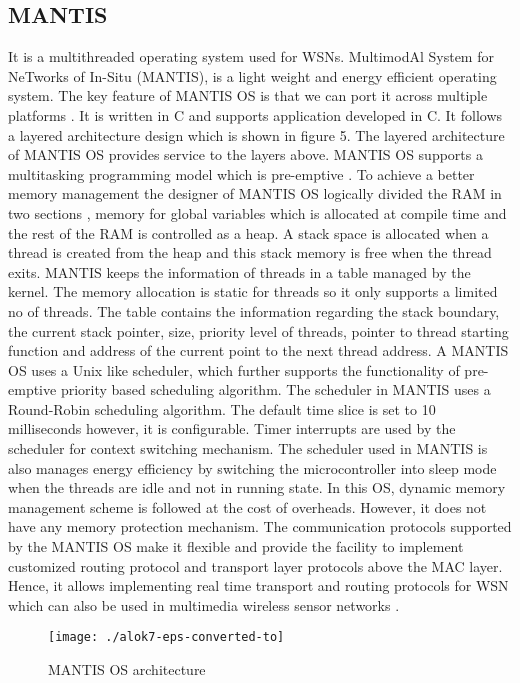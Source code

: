 \documentclass[12pt,journal,communications surveys and tutorials]{IEEEtran}
\begin{document}
\subsection{MANTIS}
It is a multithreaded operating system used for WSNs. MultimodAl System for NeTworks of In-Situ (MANTIS), is a light weight and energy efficient operating system. The key feature of MANTIS OS is that we can port it across multiple platforms . It is written in C and supports application developed in C. It follows a layered architecture design which is shown in figure 5. The layered architecture of MANTIS OS provides service to the layers above. MANTIS OS supports a multitasking programming model which is pre-emptive \cite{von2003events}. To achieve a better memory management the designer of MANTIS OS logically divided the RAM in two sections \cite{farooq2011operating}, memory for global variables which is allocated at compile time and the rest of the RAM is controlled as a heap. A stack space is allocated when a thread is created from the heap and this stack memory is free when the thread exits. MANTIS keeps the information of threads in a table managed by the kernel. The memory allocation is static for threads so it only supports a limited no of threads. The table contains the information regarding the stack boundary, the current stack pointer, size, priority level of threads, pointer to thread starting function and address of the current point to the next thread address. A MANTIS OS uses a Unix like scheduler, which further supports the functionality of pre-emptive priority based scheduling algorithm. The scheduler in MANTIS uses a Round-Robin scheduling algorithm. The default time slice is set to 10 milliseconds however, it is configurable. Timer interrupts are used by the scheduler for context switching mechanism. The scheduler used in MANTIS is also manages energy efficiency by switching the microcontroller into sleep mode when the threads are idle and not in running state. In this OS, dynamic memory management scheme is followed at the cost of overheads. However, it does not have any memory protection mechanism. The communication protocols supported by the MANTIS OS make it flexible and provide the facility to implement customized routing protocol and transport layer protocols above the MAC layer. Hence, it allows implementing real time transport and routing protocols for WSN which can also be used in multimedia wireless sensor networks \cite{farooq2011operating}.
\begin{figure}[t]
\centering
\texttt{[image: ./alok7-eps-converted-to]}
\caption {MANTIS OS architecture}
\label{fig:alok7-eps-converted-to}
\end{figure}
\end{document}
